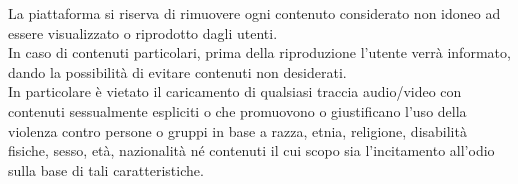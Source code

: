 La piattaforma si riserva di rimuovere ogni contenuto considerato non idoneo ad essere visualizzato o riprodotto dagli utenti.\\
In caso di contenuti particolari, prima della riproduzione l'utente verrà informato, dando la possibilità di evitare contenuti non desiderati.\\
In particolare è vietato il caricamento di qualsiasi traccia audio/video con contenuti sessualmente espliciti o che promuovono o giustificano l'uso della violenza contro persone o gruppi in base a razza, etnia, religione, disabilità fisiche, sesso, età, nazionalità né contenuti il cui scopo sia l'incitamento all'odio sulla base di tali caratteristiche.

